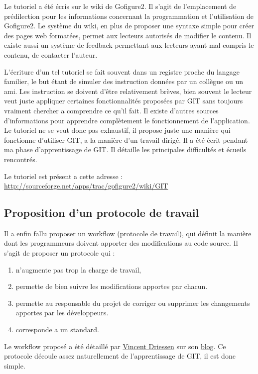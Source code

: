 Le tutoriel a été écris sur le wiki de Gofigure2. Il s'agit de l'emplacement de prédilection pour les informations 
concernant la programmation et l'utilisation de Gofigure2. Le système du wiki, en plus de proposer une syntaxe simple 
pour créer des pages web formatées, permet aux lecteurs autorisés de modifier le contenu. 
Il existe aussi un système de feedback permettant aux lecteurs ayant mal compris le contenu, de contacter l'auteur.

L'écriture d'un tel tutoriel se fait souvent dans un registre proche du langage familier,
le but étant de simuler des instruction données par un collègue ou un ami. 
Les instruction se doivent d'être relativement brèves, bien souvent le lecteur veut juste appliquer certaines fonctionnalités 
proposées par GIT sans toujours vraiment chercher a comprendre ce qu'il fait. 
Il existe d'autres sources d'informations pour apprendre complètement le fonctionnement de l'application.
Le tutoriel ne se veut donc pas exhaustif, il propose juste une manière qui fonctionne d'utiliser GIT,
a la manière d'un travail dirigé. Il a été écrit pendant ma phase d'apprentissage de GIT. 
Il détaille les principales difficultés et écueils rencontrés. 

Le tutoriel est présent a cette adresse : \\
\url{http://sourceforge.net/apps/trac/gofigure2/wiki/GIT}

\subsection{Proposition d'un protocole de travail}
Il a enfin fallu proposer un workflow (protocole de travail), qui définit la manière dont les programmeurs
doivent apporter des modifications au code source. Il s'agit de proposer un protocole qui :
\begin{enumerate}
  \item n'augmente pas trop la charge de travail,
  \item permette de bien suivre les modifications apportes par chacun. 
  \item permette au responsable du projet de corriger ou supprimer les changements apportes par les développeurs.
  \item corresponde a un standard.
\end{enumerate}
Le workflow proposé a été détaillé par \href{http://nvie.com/about }{Vincent Driessen} sur son \href{http://nvie.com/git-model}{blog}. Ce protocole découle assez naturellement de l'apprentissage de GIT, il est donc simple.

